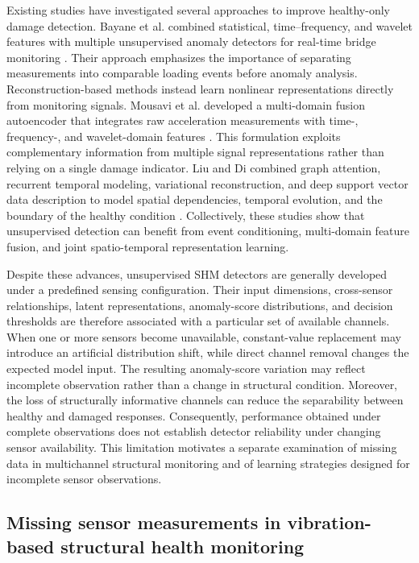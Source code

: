 \documentclass[a4paper,fleqn]{cas-sc}
\begin{document}
Existing studies have investigated several approaches to improve healthy-only damage detection. Bayane et al. combined statistical, time--frequency, and wavelet features with multiple unsupervised anomaly detectors for real-time bridge monitoring \cite{bayane2024unsupervised}. Their approach emphasizes the importance of separating measurements into comparable loading events before anomaly analysis. Reconstruction-based methods instead learn nonlinear representations directly from monitoring signals. Mousavi et al. developed a multi-domain fusion autoencoder that integrates raw acceleration measurements with time-, frequency-, and wavelet-domain features \cite{mousavi2026digital}. This formulation exploits complementary information from multiple signal representations rather than relying on a single damage indicator. Liu and Di combined graph attention, recurrent temporal modeling, variational reconstruction, and deep support vector data description to model spatial dependencies, temporal evolution, and the boundary of the healthy condition \cite{liu2026stvr}. Collectively, these studies show that unsupervised detection can benefit from event conditioning, multi-domain feature fusion, and joint spatio-temporal representation learning.

Despite these advances, unsupervised SHM detectors are generally developed under a predefined sensing configuration. Their input dimensions, cross-sensor relationships, latent representations, anomaly-score distributions, and decision thresholds are therefore associated with a particular set of available channels. When one or more sensors become unavailable, constant-value replacement may introduce an artificial distribution shift, while direct channel removal changes the expected model input. The resulting anomaly-score variation may reflect incomplete observation rather than a change in structural condition. Moreover, the loss of structurally informative channels can reduce the separability between healthy and damaged responses. Consequently, performance obtained under complete observations does not establish detector reliability under changing sensor availability. This limitation motivates a separate examination of missing data in multichannel structural monitoring and of learning strategies designed for incomplete sensor observations.

\subsection{Missing sensor measurements in vibration-based structural health monitoring}
\end{document}
